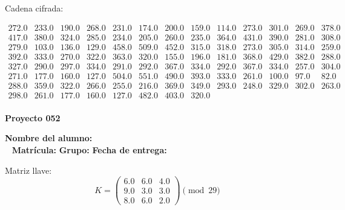 \documentclass[12pt]{article}
\begin{document}
Cadena cifrada:
\begin{center}
$\begin{array}{lllllllllllll}
272.0 & 233.0 & 190.0 & 268.0 & 231.0 & 174.0 & 200.0 & 159.0 & 114.0 & 273.0 & 301.0 & 269.0 & 378.0\\
417.0 & 380.0 & 324.0 & 285.0 & 234.0 & 205.0 & 260.0 & 235.0 & 364.0 & 431.0 & 390.0 & 281.0 & 308.0\\
279.0 & 103.0 & 136.0 & 129.0 & 458.0 & 509.0 & 452.0 & 315.0 & 318.0 & 273.0 & 305.0 & 314.0 & 259.0\\
392.0 & 333.0 & 270.0 & 322.0 & 363.0 & 320.0 & 155.0 & 196.0 & 181.0 & 368.0 & 429.0 & 382.0 & 288.0\\
327.0 & 290.0 & 297.0 & 334.0 & 291.0 & 292.0 & 367.0 & 334.0 & 292.0 & 367.0 & 334.0 & 257.0 & 304.0\\
271.0 & 177.0 & 160.0 & 127.0 & 504.0 & 551.0 & 490.0 & 393.0 & 333.0 & 261.0 & 100.0 & 97.0 & 82.0\\
288.0 & 359.0 & 322.0 & 266.0 & 255.0 & 216.0 & 369.0 & 349.0 & 293.0 & 248.0 & 329.0 & 302.0 & 263.0\\
298.0 & 261.0 & 177.0 & 160.0 & 127.0 & 482.0 & 403.0 & 320.0\\
\end{array}$
\end{center}

\newpage


\textbf{Proyecto 052}

\textbf{Nombre del alumno:} \underline{\hspace{13cm}}\\\
\vspace{1cm}
\textbf{Matrícula:} \underline{\hspace{4cm}} \hspace{1cm}
\textbf{Grupo:} \underline{\hspace{2cm}}
\textbf{Fecha de entrega:} \underline{\hspace{2cm}}

\medskip

Matriz llave:
\[
K = \begin{pmatrix}
6.0 & 6.0 & 4.0\\
9.0 & 3.0 & 3.0\\
8.0 & 6.0 & 2.0
\end{pmatrix} \pmod{29}
\]
\end{document}
